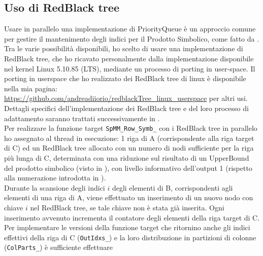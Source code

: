 \subsection{Uso di RedBlack tree} \label{chSpMMSymb:usoRBTree}
Usare in parallelo una implementazione di PriorityQueue è un approccio comune
per gestire il mantenimento degli indici \nnz per il Prodotto Simbolico, come fatto da .\\
Tra le varie possibilità disponibili, ho scelto di usare una implementazione di RedBlack tree,
che ho ricavato personalmente dalla implementazione disponibile nel kernel Linux 5.10.85 (LTS),
mediante un processo di porting in user-space.
Il porting in userspace che ho realizzato dei RedBlack tree di linux è disponibile 
nella mia pagina: \url{https://github.com/andreadiiorio/redblackTree_linux_userspace} per altri usi.\\
Dettagli specifici dell'implementazione dei RedBlack tree e del loro processo di adattamento saranno trattati successivamente in .\\
\voidLine
Per realizzare la funzione target \verb|SpMM_Row_Symb_| con i RedBlack tree in parallelo ho assegnato al thread in esecuzione: 
1 riga di A (corrispondente alla riga target di C) ed 
un RedBlack tree allocato con un numero di nodi sufficiente per la riga più lunga di C,
determinata con una riduzione sul risultato di un UpperBound  del prodotto simbolico (visto in ),
con livello informativo dell'output 1 (rispetto alla numerazione introdotta in ).\\
Durante la scansione degli indici $i$ degli elementi \nnz di B, corrispondenti agli elementi \nnz di una riga di A, 
viene effettuato un inserimento di un nuovo nodo con chiave $i$ nel RedBlack tree, se tale chiave non è stata già inserita.
Ogni inserimento avvenuto incrementa il contatore degli elementi \nnz della riga target di C.\\
Per implementare le versioni della funzione target che ritornino anche 
gli indici \nnz effettivi della riga di C (\verb|OutIdxs_|) e la loro distribuzione in partizioni di colonne (\verb|ColParts_|) è sufficiente effettuare 
